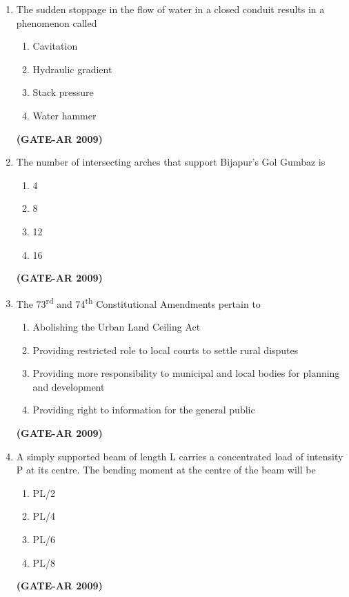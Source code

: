 \documentclass[a4paper,10pt]{article}
\begin{document}
\begin{enumerate}
    \item The sudden stoppage in the flow of water in a closed conduit results in a phenomenon called 
    \begin{multicols}{2}
	\begin{enumerate}
        \item Cavitation
        \item Hydraulic gradient
        \item Stack pressure
        \item Water hammer
    \end{enumerate}
	\end{multicols}
    \hfill \textbf{(GATE-AR 2009)}

    \item The number of intersecting arches that support Bijapur’s Gol Gumbaz is 
    \begin{multicols}{4}
	\begin{enumerate}
        \item 4
        \item 8
        \item 12
        \item 16
    \end{enumerate}
	\end{multicols}
    \hfill \textbf{(GATE-AR 2009)}
    
    \item The 73\textsuperscript{rd} and 74\textsuperscript{th} Constitutional Amendments pertain to 
    \begin{enumerate}
        \item Abolishing the Urban Land Ceiling Act
        \item Providing restricted role to local courts to settle rural disputes
        \item Providing more responsibility to municipal and local bodies for planning and development
        \item Providing right to information for the general public
    \end{enumerate}
    \hfill \textbf{(GATE-AR 2009)}
    
    \item A simply supported beam of length L carries a concentrated load of intensity P at its centre. The bending moment at the centre of the beam will be 
    \begin{multicols}{4}
	\begin{enumerate}
        \item PL/2
        \item PL/4
        \item PL/6
        \item PL/8
    \end{enumerate}
	\end{multicols}
    \hfill \textbf{(GATE-AR 2009)}


\end{enumerate}
\end{document}
